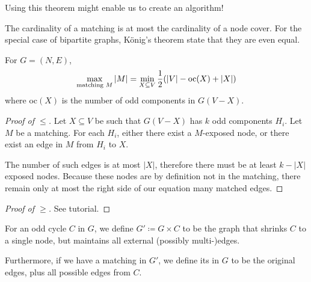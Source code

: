 Using this theorem might enable us to create an algorithm!
\begin{recall}
    The cardinality of a matching is at most the cardinality of a node cover.
    For the special case of bipartite graphs, König's theorem state that they are even equal.
\end{recall}
\begin{theorem}
    For $G=(N,E)$,
    \begin{align*}
        \max_{\text{matching } M}|M|= \min_{X \subseteq V} \frac{1}{2}(|V|-\text{oc}(X)+|X|)
    \end{align*}
    where oc$(X)$ is the number of  odd components in $G(V-X)$.
\end{theorem}
\begin{proof}[Proof of $\leq$]
    Let $X \subseteq V$ be such that $G(V-X)$ has $k$ odd components $H_i$.
    Let $M$ be a matching. For each $H_i$, either there exist a $M$-exposed node,
    or there exist an edge in $M$ from $H_i$ to $X$.

    The number of such edges is at most $|X|$, therefore there must be at least $k - |X|$ exposed nodes.
    Because these nodes are by definition not in the matching, there remain only at most
    the right side of our equation many matched edges.
\end{proof}
\begin{proof}[Proof of $\geq$]
    See tutorial.
\end{proof}
\begin{definition}
    For an odd cycle $C$ in $G$, we define $G' \coloneqq G \times C$ to be the graph
    that shrinks $C$ to a single node, but maintains all external (possibly multi-)edges.

    Furthermore, if we have a matching in $G'$, we define its  in $G$
    to be the original edges, plus all possible edges from $C$.
\end{definition}
